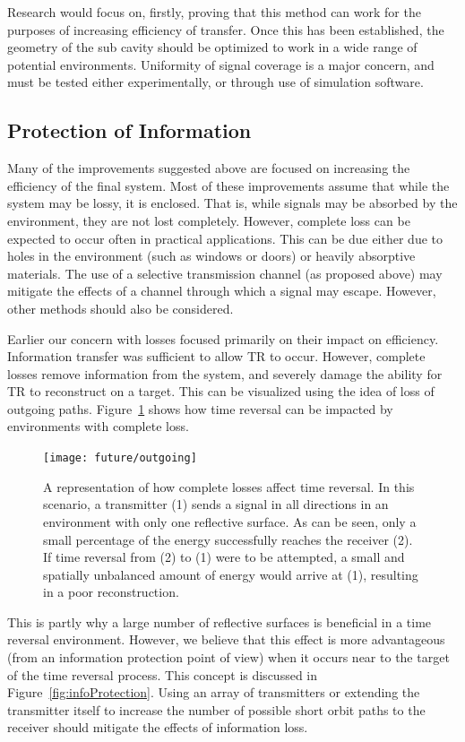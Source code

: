 Research would focus on, firstly, proving that this method can work for the purposes of increasing efficiency of transfer. Once this has been established, the geometry of the sub cavity should be optimized to work in a wide range of potential environments. Uniformity of signal coverage is a major concern, and must be tested either experimentally, or through use of simulation software.

\subsection{Protection of Information}
Many of the improvements suggested above are focused on increasing the efficiency of the final system. Most of these improvements assume that while the system may be lossy, it is enclosed. That is, while signals may be absorbed by the environment, they are not lost completely. However, complete loss can be expected to occur often in practical applications. This can be due either due to holes in the environment (such as windows or doors) or heavily absorptive materials. The use of a selective transmission channel (as proposed above) may mitigate the effects of a channel through which a signal may escape. However, other methods should also be considered.

Earlier our concern with losses focused primarily on their impact on efficiency. Information transfer was sufficient to allow TR to occur. However, complete losses remove information from the system, and severely damage the ability for TR to reconstruct on a target. This can be visualized using the idea of loss of outgoing paths. Figure~\ref{fig:outgo} shows how time reversal can be impacted by environments with complete loss.

\begin{figure}[h]
\centering
\texttt{[image: future/outgoing]}
\caption[Example of information loss on time reversal efficacy]{A representation of how complete losses affect time reversal. In this scenario, a transmitter (1) sends a signal in all directions in an environment with only one reflective surface. As can be seen, only a small percentage of the energy successfully reaches the receiver (2). If time reversal from (2) to (1) were to be attempted, a small and spatially unbalanced amount of energy would arrive at (1), resulting in a poor reconstruction.}
\label{fig:outgo}
\end{figure}

\newpage

This is partly why a large number of reflective surfaces is beneficial in a time reversal environment. However, we believe that this effect is more advantageous (from an information protection point of view) when it occurs near to the target of the time reversal process. This concept is discussed in Figure~\ref{fig:infoProtection}. Using an array of transmitters or extending the transmitter itself to increase the number of possible short orbit paths to the receiver should mitigate the effects of information loss.

